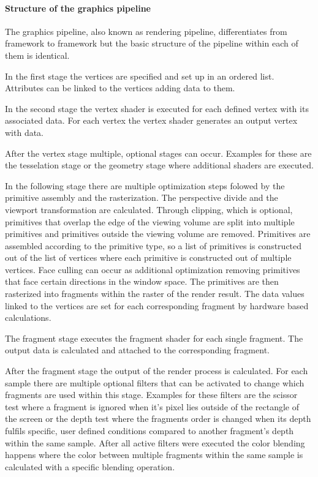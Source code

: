 \paragraph{Structure of the graphics pipeline}
\label{paragraph:pipeline}

The graphics pipeline, also known as rendering pipeline, differentiates from framework to framework but the basic structure of the pipeline within each of them is identical.

In the first stage the vertices are specified and set up in an ordered list. Attributes can be linked to the vertices adding data to them.

In the second stage the vertex shader is executed for each defined vertex with its associated data. For each vertex the vertex shader generates an output vertex with data.

After the vertex stage multiple, optional stages can occur. Examples for these are the tesselation stage or the geometry stage where additional shaders are executed.

In the following stage there are multiple optimization steps folowed by the primitive assembly and the rasterization. The perspective divide and the viewport transformation are calculated. Through clipping, which is optional, primitives that overlap the edge of the viewing volume are split into multiple primitives and primitives outside the viewing volume are removed. Primitives are assembled according to the primitive type, so a list of primitives is constructed out of the list of vertices where each primitive is constructed out of multiple vertices. Face culling can occur as additional optimization removing primitives that face certain directions in the window space. The primitives are then rasterized into fragments within the raster of the render result. The data values linked to the vertices are set for each corresponding fragment by hardware based calculations.

The fragment stage executes the fragment shader for each single fragment. The output data is calculated and attached to the corresponding fragment.

After the fragment stage the output of the render process is calculated. For each sample there are multiple optional filters that can be activated to change which fragments are used within this stage. Examples for these filters are the scissor test where a fragment is ignored when it's pixel lies outside of the rectangle of the screen or the depth test where the fragments order is changed when its depth fulfils specific, user defined conditions compared to another fragment's depth within the same sample. After all active filters were executed the color blending happens where the color between multiple fragments within the same sample is calculated with a specific blending operation.

